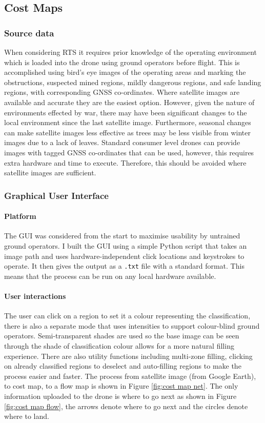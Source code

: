 \subsection{Cost Maps}\label{sub_section:tgt_cost_maps}
\subsubsection{Source data}\label{sub_sub_section:tgt_source_data}
When considering \gls{RTS} it requires prior knowledge of the operating environment which is loaded into the drone using ground operators before flight. This is accomplished using bird's eye images of the operating areas and marking the obstructions, suspected mined regions, mildly dangerous regions, and safe landing regions, with corresponding \gls{GNSS} co-ordinates.
Where satellite images are available and accurate they are the easiest option. However, given the nature of environments effected by war, there may have been significant changes to the local environment since the last satellite image. Furthermore, seasonal changes can make satellite images less effective as trees may be less visible from winter images due to a lack of leaves.
Standard consumer level drones can provide images with tagged \gls{GNSS} co-ordinates that can be used, however, this requires extra hardware and time to execute. Therefore, this should be avoided where satellite images are sufficient.

\subsubsection{Graphical User Interface}\label{sub_sub_section:tgt_GUI}
\paragraph{Platform} 
The \gls{GUI} was considered from the start to maximise usability by untrained ground operators. I built the \gls{GUI} using a simple Python script that takes an image path and uses hardware-independent click locations and keystrokes to operate. It then gives the output as a \texttt{.txt} file with a standard format. This means that the process can be run on any local hardware available.
\paragraph{User interactions}
The user can click on a region to set it a colour representing the classification, there is also a separate mode that uses intensities to support colour-blind ground operators. Semi-transparent shades are used so the base image can be seen through the shade of classification colour allows for a more natural filling experience. There are also utility functions including multi-zone filling, clicking on already classified regions to deselect and auto-filling regions to make the process easier and faster. The process from satellite image (from Google Earth), to cost map, to a flow map is shown in Figure \ref{fig:cost map net}. The only information uploaded to the drone is where to go next as shown in Figure \ref{fig:cost map flow}, the arrows denote where to go next and the circles denote where to land.

